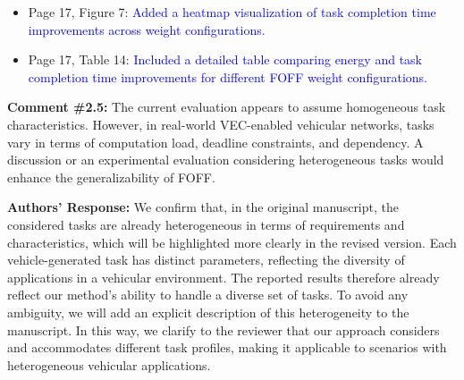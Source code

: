 \begin{itemize}
{\begin{enumerate}
        \item For delay-sensitive applications (e.g., real-time processing), the $\omega$=[vh,vh] configuration ensures minimum latency while still providing substantial energy savings compared to baseline approaches.
        \item The robust latency performance across various configurations suggests that FOFF can maintain good responsiveness even when optimizing for energy efficiency.
    \end{enumerate} This sensitivity analysis demonstrates that FOFF provides a flexible and effective mechanism for adapting the offloading strategy to different operational requirements and constraints. System administrators can select appropriate weight configurations based on their specific performance priorities without requiring modifications to the underlying algorithm.}
    \item Page 17, Figure 7: \textcolor{blue}{Added a heatmap visualization of task completion time improvements across weight configurations.}
    \item Page 17, Table 14: \textcolor{blue}{Included a detailed table comparing energy and task completion time improvements for different FOFF weight configurations.}
\end{itemize}

\begin{mdframed}[style=review] 
\textbf{Comment \#2.5:} The current evaluation appears to assume homogeneous task characteristics. However, in real-world VEC-enabled vehicular networks, tasks vary in terms of computation load, deadline constraints, and dependency. A discussion or an experimental evaluation considering heterogeneous tasks would enhance the generalizability of FOFF.
\end{mdframed}

\textbf{Authors' Response:}
We confirm that, in the original manuscript, the considered tasks are already heterogeneous in terms of requirements and characteristics, which will be highlighted more clearly in the revised version. Each vehicle-generated task has distinct parameters, reflecting the diversity of applications in a vehicular environment. The reported results therefore already reflect our method's ability to handle a diverse set of tasks. To avoid any ambiguity, we will add an explicit description of this heterogeneity to the manuscript. In this way, we clarify to the reviewer that our approach considers and accommodates different task profiles, making it applicable to scenarios with heterogeneous vehicular applications.
\vspace{\baselineskip}

